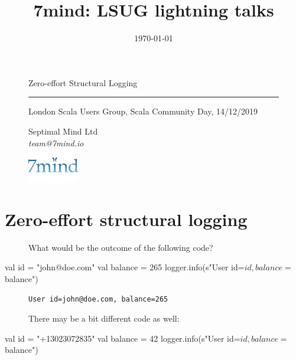 \documentclass[usenames,dvipsnames,aspectratio=169]{beamer}
\title{7mind: LSUG lightning talks}
\institute[Septimal Mind Ltd]
    {
    Septimal Mind Ltd\\
    \medskip
    \textit{team@7mind.io}
    }
\date{\today}
\begin{document}
\begin{frame}

\begin{figure}
\color{RubineRed}
\Huge Zero-effort Structural Logging

\rule{\linewidth}{1mm}

\normalsize London Scala Users Group, Scala Community Day, 14/12/2019
\end{figure}

\begin{figure}
  Septimal Mind Ltd \\
  \textit{team@7mind.io} \\
  \includegraphics[width=0.2\textwidth]{media/logo_7mind.png}
\end{figure}

\end{frame}

\section{Zero-effort structural logging}


\begin{frame}[fragile]
  \begin{figure}
  What would be the outcome of the following code?
  \end{figure}
\begin{scalacode}
val id = "john@doe.com"
val balance = 265
logger.info(s"User id=$id, balance=$balance")
\end{scalacode}
\end{frame}


\begin{frame}
  \begin{figure}
  \huge
  \texttt{User id=john@doe.com, balance=265}
  \end{figure}
\end{frame}


\begin{frame}[fragile]
  \begin{figure}
  There may be a bit different code as well:
  \end{figure}
\begin{scalacode}
val id = "+13023072835"
val balance = 42
logger.info(s"User id=$id, balance=$balance")
\end{scalacode}
\end{frame}
\end{document}
